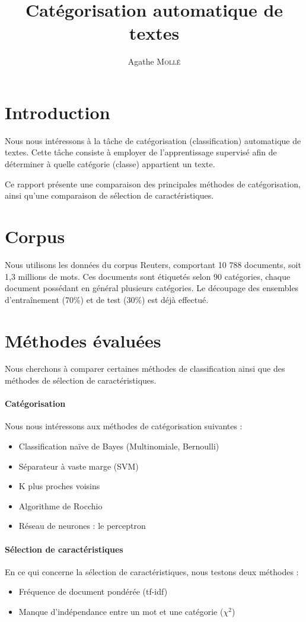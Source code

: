 \documentclass[a4paper,12pt]{article}
\title{Catégorisation automatique de textes}
\author{Agathe \textsc{Mollé}}
\date{}
\begin{document}
	\maketitle

	\section*{Introduction}
		Nous nous intéressons à la tâche de catégorisation (classification) automatique de textes. Cette tâche consiste à employer de l'apprentissage supervisé afin de déterminer à quelle catégorie (classe) appartient un texte.

		Ce rapport présente une comparaison des principales méthodes de catégorisation, ainsi qu'une comparaison de sélection de caractéristiques.

	\section*{Corpus}
		Nous utilisons les données du corpus Reuters, comportant 10 788 documents, soit 1,3 millions de mots. Ces documents sont étiquetés selon 90 catégories, chaque document possédant en général plusieurs catégories. Le découpage des ensembles d'entraînement (70\%) et de test (30\%) est déjà effectué.

	\section*{Méthodes évaluées}
		Nous cherchons à comparer certaines méthodes de classification ainsi que des méthodes de sélection de caractéristiques.

		\paragraph*{Catégorisation}
			Nous nous intéressons aux méthodes de catégorisation suivantes :
			\begin{itemize}
				\item Classification naïve de Bayes (Multinomiale, Bernoulli)
				\item Séparateur à vaste marge (SVM)
				\item K plus proches voisins
				\item Algorithme de Rocchio
				\item Réseau de neurones : le perceptron
			\end{itemize}

		\paragraph*{Sélection de caractéristiques}
			En ce qui concerne la sélection de caractéristiques, nous testons deux méthodes :
			\begin{itemize}
				\item Fréquence de document pondérée (tf-idf)
				\item Manque d'indépendance entre un mot et une catégorie ($\chi^2$)
			\end{itemize}
\end{document}
